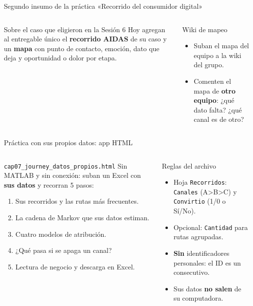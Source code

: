 \documentclass[aspectratio=169,xcolor=dvipsnames]{beamer}
\begin{document}
\begin{frame}{Segundo insumo de la práctica «Recorrido del consumidor digital»}
\begin{columns}[T]
  \begin{block}{Sobre el caso que eligieron en la Sesión 6}
    \small Hoy agregan al entregable único el \textbf{recorrido AIDAS} de su caso y un \textbf{mapa} con punto de contacto, emoción, dato que deja y oportunidad o dolor por etapa.
  \end{block}
  \begin{exampleblock}{Wiki de mapeo}
    \scriptsize
    \begin{itemize}
      \item Suban el mapa del equipo a la wiki del grupo.
      \item Comenten el mapa de \textbf{otro equipo}: ¿qué dato falta? ¿qué canal es de otro?
    \end{itemize}
  \end{exampleblock}
\end{columns}
\end{frame}

\begin{frame}{Práctica con sus propios datos: app HTML}
\begin{columns}[T]
  \begin{block}{\texttt{cap07\_journey\_datos\_propios.html}}
    \small Sin MATLAB y sin conexión: suban un Excel con \textbf{sus datos} y recorran 5 pasos:
    \scriptsize
    \begin{enumerate}
      \item Sus recorridos y las rutas más frecuentes.
      \item La cadena de Markov que sus datos estiman.
      \item Cuatro modelos de atribución.
      \item ¿Qué pasa si se apaga un canal?
      \item Lectura de negocio y descarga en Excel.
    \end{enumerate}
  \end{block}
  \begin{exampleblock}{Reglas del archivo}
    \scriptsize
    \begin{itemize}
      \item Hoja \texttt{Recorridos}: \texttt{Canales} (A>B>C) y \texttt{Convirtio} (1/0 o Sí/No).
      \item Opcional: \texttt{Cantidad} para rutas agrupadas.
      \item \textbf{Sin} identificadores personales: el ID es un consecutivo.
      \item Sus datos \textbf{no salen} de su computadora.
    \end{itemize}
  \end{exampleblock}
\end{columns}
\end{frame}
\end{document}
